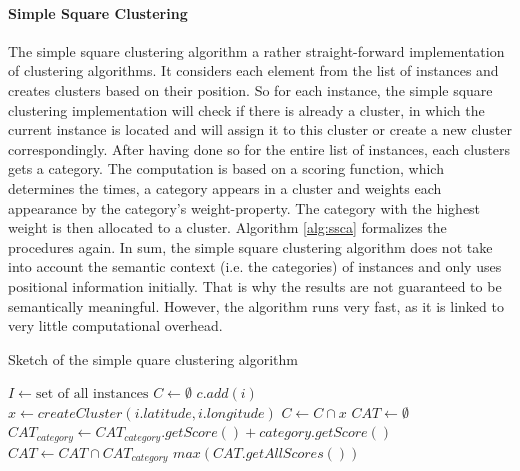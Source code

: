 \paragraph{Simple Square Clustering }
The simple square clustering algorithm a rather straight-forward implementation of clustering algorithms. It considers each element from the list of instances and creates clusters based on their position. So for each instance, the simple square clustering implementation will check if there is already a cluster, in which the current instance is located and will assign it to this cluster or create a new cluster correspondingly. After having done so for the entire list of instances, each clusters gets a category. The computation is based on a scoring function, which determines the times, a category appears in a cluster and weights each appearance by the category’s weight-property. The category with the highest weight is then allocated to a cluster. Algorithm \ref{alg:ssca} formalizes the procedures again. In sum, the simple square clustering algorithm does not take into account the semantic context (i.e. the categories) of instances and only uses positional information initially. That is why the results are not guaranteed to be semantically meaningful. However, the algorithm runs very fast, as it is linked to very little computational overhead.


\begin{algorithm}
\caption{Sketch of the simple quare clustering algorithm}\label{alg:ssca}
\begin{algorithmic} 
\STATE $I \gets \text{set~of~all~instances}$
\STATE $C \gets \emptyset$
  \STATE $c.add(i)$
  \ELSE 
  \STATE $x \gets createCluster(i.latitude, i.longitude)$
  \STATE $C \gets C \cap x$
\ENDIF
\ENDFOR
\ENDFOR
\STATE ${CAT} \gets \emptyset$
\STATE ${CAT}_{category} \gets {CAT}_{category}.getScore() + category.getScore()$
\STATE ${CAT} \gets {CAT} \cap {CAT}_{category}$
\ENDFOR
\ENDFOR
\RETURN $max({CAT}.getAllScores())$
\end{algorithmic}
\end{algorithm}

